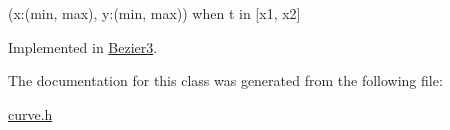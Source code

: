 (x\+:(min, max), y\+:(min, max)) when t in \mbox{[}x1, x2\mbox{]} 



Implemented in \hyperlink{classBezier3_aa5a1d33483071204f99774fefb092caf}{Bezier3}.



The documentation for this class was generated from the following file\+:\begin{DoxyCompactItemize}
\item 
\hyperlink{curve_8h}{curve.\+h}\end{DoxyCompactItemize}
